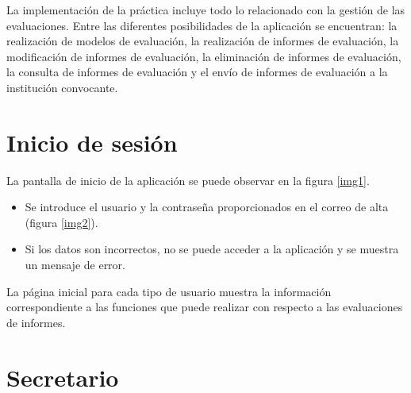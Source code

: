 \documentclass[12pt,a4paper,titlepage,spanish,twoside]{book}
\begin{document}
La implementación de la práctica incluye todo lo relacionado con la gestión de
las e\-va\-lua\-cio\-nes. Entre las diferentes posibilidades de la aplicación se
encuentran: la realización de modelos de evaluación, la realización de informes
de evaluación, la modificación de informes de evaluación, la eliminación de 
informes de evaluación, la consulta de informes de evaluación y el envío de 
informes de evaluación a la institución convocante.

\section{Inicio de sesión}
La pantalla de inicio de la aplicación se puede observar en la figura
\ref{img1}.


\begin{itemize}
\item Se introduce el usuario y la contraseña proporcionados en el correo de 
alta (figura \ref{img2}).


\item Si los datos son incorrectos, no se puede acceder a la aplicación y se
  muestra un mensaje de error. 
\end{itemize}

La página inicial para cada tipo de usuario muestra la información 
correspondiente a las funciones que puede realizar con respecto a las 
evaluaciones de informes.


\section{Secretario}
\end{document}
